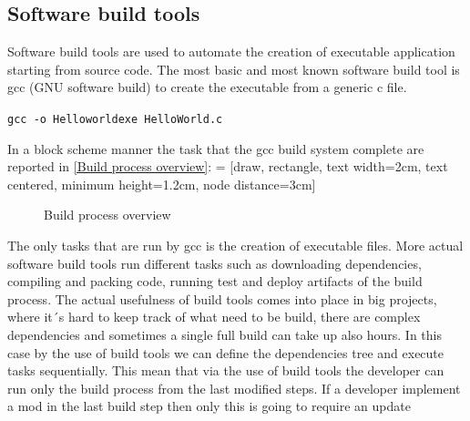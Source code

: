 \documentclass[../main.tex]{subfiles}
\begin{document}
\subsection{Software build tools}
Software build tools are used to automate the creation of executable application starting from source code. The most basic and most known software build tool is gcc (GNU software build) to create the executable from a generic c file. 
\begin{center}
    \texttt{gcc -o Helloworldexe HelloWorld.c}
\end{center}
In a block scheme manner the task that the gcc build system complete are reported in \ref{Build process overview}:
 = [draw, rectangle, text width=2cm, text centered, minimum height=1.2cm, node distance=3cm]
\begin{figure}[h]
  \centering
{}
  \caption{Build process overview}
\end{figure}
The only tasks that are run by gcc is the creation of executable files. More actual software build tools run different tasks such as downloading dependencies, compiling and packing code, running test and deploy artifacts of the build process. The actual usefulness of build tools comes into place in big projects, where it´s hard to keep track of what need to be build, there are complex dependencies and sometimes a single full build can take up also hours. In this case by the use of build tools we can define the dependencies tree and execute tasks sequentially. This mean that via the use of build tools the developer can run only the build process from the last modified steps. If a developer implement a mod in the last build step then only this is going to require an update 
\end{document}
